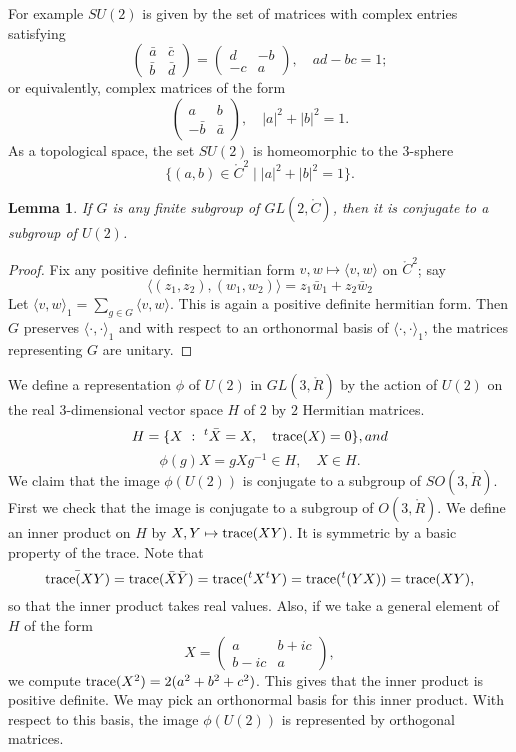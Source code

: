 \documentclass{amsart}
\newtheorem{lemma}[equation]{Lemma}
\def\t#1{\hbox{}^t#1}
\begin{document}
For example $SU(2)$ is given by the set of matrices with complex entries satisfying
\[
\begin{pmatrix}{\bar a} & {\bar c} \\ \bar b & \bar d\end{pmatrix} = 
\begin{pmatrix}d & - b\\ -c & a \end{pmatrix},\quad ad - bc = 1;
\]
or equivalently, complex matrices of the form
\[
\begin{pmatrix}a & b\\ -\bar b & \bar a\end{pmatrix},\quad |a|^2 + |b|^2 = 1.
\]
As a topological space, the set $SU(2)$ is homeomorphic to
 the $3$-sphere 
$$\{(a,b)\in \ring{C}^2\mid |a|^2 + |b|^2 = 1\}.$$


\begin{lemma} If $G$ is any finite subgroup of $GL(2,\ring{C})$, then it is
conjugate to a subgroup of $U(2)$.
\end{lemma}

\begin{proof} Fix any positive definite hermitian form $v,w\mapsto \langle v,w\rangle $ on $\ring{C}^2$;
say 
\[\langle (z_1,z_2),(w_1,w_2)\rangle  = z_1 \bar w_1 + z_2 \bar w_2\]
Let $\langle v,w\rangle_1 = \sum_{g\in G} \langle v,w\rangle$.  This is again a positive definite
hermitian form.    Then $G$ preserves $\langle\cdot,\cdot\rangle_1$ and with respect 
to an orthonormal basis  of $\langle\cdot,\cdot\rangle_1$, the matrices representing $G$ are unitary.
\end{proof}

We define a representation $\phi$ of $U(2)$ in $GL(3,\ring{R})$ by the action of $U(2)$ on the real $3$-dimensional
 vector space $H$
of $2$ by $2$ Hermitian matrices.
\[
H = \{ X \mid \t{\bar X} = X,\quad \op{trace}(X)=0\}, and 
\]
  \[
   \phi(g) X = {g} X g^{-1} \in H, \quad X\in H.
  \]
We claim that the image $\phi(U(2))$ is conjugate to a subgroup of  $SO(3,\ring{R})$.
First we check that the image is conjugate to a subgroup of $O(3,\ring{R})$.  We define an inner product
on $H$ by  $X,Y\mapsto {\operatorname{trace}}(XY)$.  It is symmetric by a basic property of the trace.  Note that 
\[
\bar {\op{trace}(XY)} = \op{trace}(\bar X \bar Y) = \op{trace}(\t{X}\t{Y}) = \op{trace}(\t{(YX)}) = \op{trace}(XY),
\]
so that the inner product takes real values.
Also, if we take a general element of $H$ of the form
\[
X = \begin{pmatrix} a & b + i c \\ b - i c & a\end{pmatrix},
\]
we compute ${\operatorname{trace}}(X^2) = 2 (a^2 + b^2 + c^2)$.  This gives that the inner product is positive definite.  We may
pick an orthonormal basis for this inner product.  With respect to this basis, the image $\phi(U(2))$
is represented by orthogonal matrices.
\end{document}
